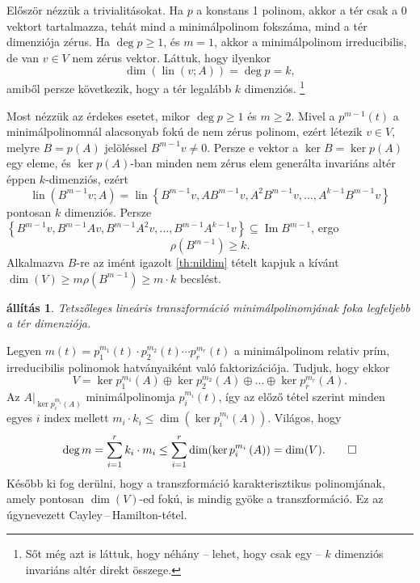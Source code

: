\documentclass[a4paper, showtrims]{memoir}
\makeatletter
\renewenvironment{proof}[1][\proofname]
    {\par\pushQED{\qed}%
    \normalfont \topsep6\p@\@plus6\p@\relax
    \trivlist
    \item[\hskip\labelsep
        \itshape
    #1\@addpunct{:}]\ignorespaces}
    {\popQED\endtrivlist\@endpefalse}
\theoremstyle{plain}
\newtheorem{proposition}{állítás}[chapter]
\theoremstyle{remark}
\theoremstyle{definition}
\DeclareMathOperator{\lin}{lin}
\DeclareMathOperator{\im}{Im}
\makeatother
\begin{document}
\begin{proof}
	Először nézzük a trivialitásokat.
	Ha $p$ a konstans 1 polinom, akkor a tér csak a 0 vektort tartalmazza,
	tehát mind a minimálpolinom fokszáma, mind a tér dimenziója zérus.
	Ha $\deg p\geq 1$, és $m=1$, akkor a minimálpolinom irreducibilis,
	de van $v\in V$ nem zérus vektor.
	Láttuk, hogy ilyenkor
	\[
		\dim\left( \lin\left( v;A \right) \right)=\deg p=k,
	\]
	amiből persze következik, hogy a tér legalább $k$ dimenziós.
	\footnote{Sőt még azt is láttuk, hogy néhány -- lehet, hogy csak egy -- $k$ dimenziós invariáns altér direkt összege.}

	Most nézzük az érdekes esetet,
	mikor $\deg p\geq 1$ és $m\geq 2$.
	Mivel a
	\begin{math}
		p^{m-1}\left( t \right)
	\end{math}
	a minimálpolinomnál alacsonyab fokú de nem zérus polinom,
	ezért létezik $v\in V$, melyre $B=p\left( A \right)$ jelöléssel
	\(
	B^{m-1}v\neq 0.
	\)
	Persze e vektor a $\ker B=\ker p\left( A \right)$
	egy eleme,
	és $\ker p\left( A \right)$-ban minden nem zérus elem generálta invariáns altér éppen $k$-dimenziós,
	ezért
	\[
		\lin(B^{m-1}v;A)=
		\lin\left\{
		B^{m-1}v,
		AB^{m-1}v,
		A^2B^{m-1}v,
		\ldots,
		A^{k-1}B^{m-1}v
		\right\}
	\]
	pontosan $k$ dimenziós.
	Persze $\left\{ B^{m-1}v,B^{m-1}Av,B^{m-1}A^2v,\ldots,B^{m-1}A^{k-1}v \right\}\subseteq \im B^{m-1}$,
	ergo
	\[
		\rho\left( B^{m-1}\right)\geq k.
	\]
	Alkalmazva $B$-re az imént igazolt \ref{th:nildim} tételt kapjuk a kívánt
	\(
	\dim(V)\geq m\rho\left( B^{m-1} \right)\geq m\cdot k
	\)
	becslést.
\end{proof}
\begin{proposition}
	Tetszőleges lineáris transzformáció minimálpolinomjának foka legfeljebb a tér dimenziója.
	\label{th:minpol}
\end{proposition}
\begin{proof}
	Legyen
	$
		m\left( t \right)
		=
		p_1^{m_1}\left( t \right)\cdot
		p_2^{m_2}\left( t \right)\cdots
		p_r^{m_r}\left( t \right)
	$
	a minimálpolinom relativ prím, irreducibilis polinomok hatványaiként való faktorizációja.
	Tudjuk, hogy ekkor
	\[
		V
		=
		\ker p_1^{m_1}\left( A \right)
		\oplus
		\ker p_2^{m_2}\left( A \right)
		\oplus\dots\oplus
		\ker p_r^{m_r}\left( A \right).
	\]
	Az $A|_{\ker p_i^{m_i}\left( A \right)}$ minimálpolinomja $p_i^{m_i}\left( t \right)$, így az előző tétel szerint minden egyes $i$ index mellett
	$
		m_i\cdot k_i\leq \dim(\ker p_i^{m_i}\left( A \right)).
	$
	Világos, hogy
	\[
		\deg m
		=
		\sum_{i=1}^rk_i\cdot m_i
		\leq
		\sum_{i=1}^r\dim(\ker p_i^{m_i}\left( A \right))
		=
		\dim(V).\qedhere
	\]
\end{proof}
Később ki fog derülni,
hogy a transzformáció karakterisztikus polinomjának, amely pontosan $\dim(V)$-ed fokú,
is mindig gyöke a transzformáció.
Ez az úgynevezett Cayley\,--\,Hamilton-tétel.
\end{document}
